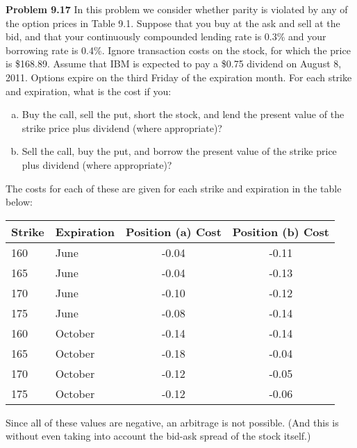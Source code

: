 \documentclass[12pt]{article}
\newcommand{\problem}[1]{\bigskip \noindent \textbf{Problem #1}}
\theoremstyle{plain}
\begin{document}
\problem{9.17} In this problem we consider whether parity is violated by any of the option prices in Table 9.1. Suppose that you buy at the ask and sell at the bid, and that your continuously compounded lending rate is 0.3\% and your borrowing rate is 0.4\%. Ignore transaction costs on the stock, for which the price is \$168.89. Assume that IBM is expected to pay a \$0.75 dividend on August 8, 2011. Options expire on the third Friday of the expiration month. For each strike and expiration, what is the cost if you:

\begin{enumerate}[(a)]
\item Buy the call, sell the put, short the stock, and lend the present value of the strike price plus dividend (where appropriate)?
\item Sell the call, buy the put, and borrow the present value of the strike price plus dividend (where appropriate)?
\end{enumerate}

The costs for each of these are given for each strike and expiration in the table below:
\begin{center}
\begin{tabular}{ll||cc}
Strike & Expiration & Position (a) Cost & Position (b) Cost \\ \hline \hline
160 & June & -0.04 & -0.11\\
165 & June & -0.04 & -0.13\\
170 & June & -0.10 & -0.12\\
175 & June & -0.08 & -0.14\\
160 & October & -0.14 & -0.14\\
165 & October & -0.18 & -0.04\\
170 & October & -0.12 & -0.05\\
175 & October & -0.12 & -0.06
\end{tabular}
\end{center}
Since all of these values are negative, an arbitrage is not possible. (And this is without even taking into account the bid-ask spread of the stock itself.)
\end{document}
